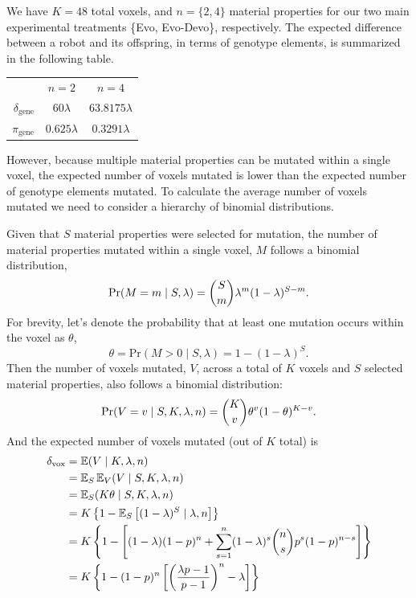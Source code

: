 We have $K=48$ total voxels, and $n=\{2,4\}$ material properties for our two main experimental treatments \{Evo, Evo-Devo\}, respectively. The expected difference between a robot and its offspring, in terms of genotype elements, is summarized in the following table.
\vspace{-1em}
\begin{table}[!ht]
\centering
\begin{tabular}{rcc}
 & $n=2$ & $n=4$  \\ \cline{2-3} 
\multicolumn{1}{r|}{$\delta_{\text{gene}}$}     & \multicolumn{1}{c|}{$60\lambda$}    & \multicolumn{1}{c|}{$63.8175\lambda$} \\ \cline{2-3} 
\multicolumn{1}{r|}{$\pi_{\text{gene}}$} & \multicolumn{1}{c|}{$0.625\lambda$} & \multicolumn{1}{c|}{$0.3291\lambda$}  \\ \cline{2-3} 
\end{tabular}
\end{table}

\noindent
However, because multiple material properties can be mutated within a single voxel, the expected number of voxels mutated is lower than the expected number of genotype elements mutated. 
To calculate the average number of voxels mutated we need to consider a hierarchy of binomial distributions.


Given that $S$ material properties were selected for mutation,
the number of material properties mutated within a single voxel, $M$ follows a binomial distribution, 
\begin{equation}
\text{Pr}(M=m \mid S, \lambda) 
= 
\dbinom{S}{m} \lambda^m (1-\lambda)^{S-m} .
\end{equation}
For brevity, let's denote the probability that at least one mutation occurs within the voxel as $\theta$,
\begin{equation}
\theta = \text{Pr}(M>0 \mid S,\lambda)
=
1-(1-\lambda)^S .
\end{equation}
Then the number of voxels mutated, $V$, across a total of $K$ voxels and $S$ selected material properties, also follows a binomial distribution:
\begin{equation}
\text{Pr}(V=v \mid S, K, \lambda, n) 
= 
\dbinom{K}{v} \theta^v (1-\theta)^{K-v}.
\end{equation}
And the expected number of voxels mutated (out of $K$ total) is
\begin{align}
\delta_{\text{vox}}
&=
\mathbb{E}(V \mid K, \lambda, n) \\
&=
\mathbb{E}_S \, \mathbb{E}_{V}(V \mid S, K, \lambda, n) \\
&= 
\mathbb{E}_S (K\theta \mid S, K, \lambda, n) \\
&=
K \left\{
1-\mathbb{E}_S \left[(1-\lambda)^S \mid \lambda, n\right] \right\} \\
&=
K \left\{ 1 - \left[ (1-\lambda)(1-p)^n
+  \sum_{s=1}^{n} (1-\lambda)^s \dbinom{n}{s} p^s (1-p)^{n-s}
 \right] \right\} \\
&=
K \left\{ 
1 - (1-p)^n \left[ \left(\frac{\lambda p-1}{p - 1}\right)^n - \lambda\right]
\right\} 
\end{align}

